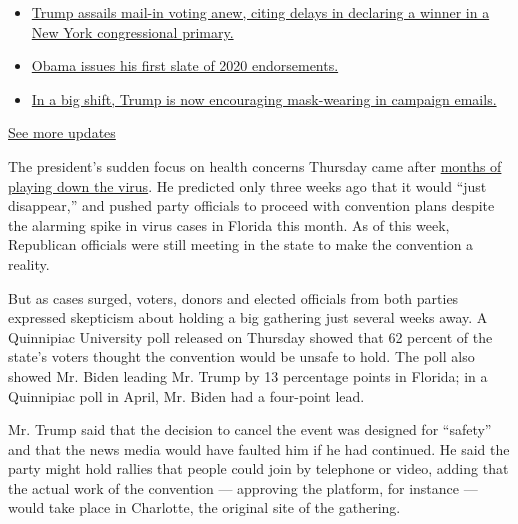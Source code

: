 \begin{itemize}
\tightlist
\item
  \href{https://www.nytimes.com/2020/08/03/us/elections/biden-vs-trump.html?action=click\&pgtype=Article\&state=default\&region=MAIN_CONTENT_1\&context=storylines_live_updates\#link-6494b448}{Trump
  assails mail-in voting anew, citing delays in declaring a winner in a
  New York congressional primary.}
\item
  \href{https://www.nytimes.com/2020/08/03/us/elections/biden-vs-trump.html?action=click\&pgtype=Article\&state=default\&region=MAIN_CONTENT_1\&context=storylines_live_updates\#link-3de249e6}{Obama
  issues his first slate of 2020 endorsements.}
\item
  \href{https://www.nytimes.com/2020/08/03/us/elections/biden-vs-trump.html?action=click\&pgtype=Article\&state=default\&region=MAIN_CONTENT_1\&context=storylines_live_updates\#link-54e34d20}{In
  a big shift, Trump is now encouraging mask-wearing in campaign
  emails.}
\end{itemize}

\href{https://www.nytimes.com/2020/08/03/us/elections/biden-vs-trump.html?action=click\&pgtype=Article\&state=default\&region=MAIN_CONTENT_1\&context=storylines_live_updates}{See
more updates}

The president's sudden focus on health concerns Thursday came after
\href{https://www.nytimes.com/2020/07/18/us/politics/trump-coronavirus-response-failure-leadership.html}{months
of playing down the virus}. He predicted only three weeks ago that it
would ``just disappear,'' and pushed party officials to proceed with
convention plans despite the alarming spike in virus cases in Florida
this month. As of this week, Republican officials were still meeting in
the state to make the convention a reality.

But as cases surged, voters, donors and elected officials from both
parties expressed skepticism about holding a big gathering just several
weeks away. A Quinnipiac University poll released on Thursday showed
that 62 percent of the state's voters thought the convention would be
unsafe to hold. The poll also showed Mr. Biden leading Mr. Trump by 13
percentage points in Florida; in a Quinnipiac poll in April, Mr. Biden
had a four-point lead.

Mr. Trump said that the decision to cancel the event was designed for
``safety'' and that the news media would have faulted him if he had
continued. He said the party might hold rallies that people could join
by telephone or video, adding that the actual work of the convention ---
approving the platform, for instance --- would take place in Charlotte,
the original site of the gathering.

